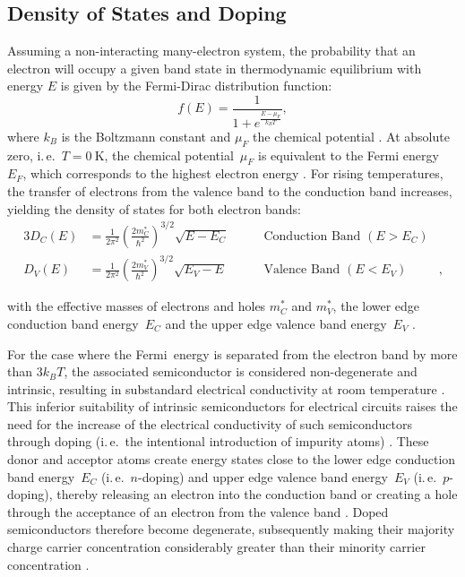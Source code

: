 \subsection{Density of States and Doping} \label{ssec:density-of-states-doping}
Assuming a non-interacting many-electron system, the probability that an electron will occupy a given band state in thermodynamic equilibrium with energy $E$ is given by the Fermi-Dirac distribution function:
\begin{equation}
  f\left(E\right) = \frac{1}{1 + e^{\frac{E-\mu_F}{k_B T}}},
\end{equation}
where $k_B$ is the Boltzmann constant and $\mu_F$ the chemical potential \cite{Piprek2003,Kittel2004,Yu2010}. At absolute zero, i.\,e.\ $T = \SI{0}{\kelvin}$, the chemical potential~$\mu_F$ is equivalent to the Fermi energy~$E_F$, which corresponds to the highest electron energy \cite{Piprek2003,Kittel2004,Yu2010}. For rising temperatures, the transfer of electrons from the valence band to the conduction band increases, yielding the density of states for both electron bands:
\begin{alignat}{3}
  D_C\left(E\right) &= \frac{1}{2\pi^2} \left(\frac{2m_C^\ast}{\hbar^2}\right)^{3/2} \sqrt{E-E_C} &\qquad\text{Conduction Band $\left(E > E_C\right)$}&\\
  D_V\left(E\right) &= \frac{1}{2\pi^2} \left(\frac{2m_V^\ast}{\hbar^2}\right)^{3/2} \sqrt{E_V-E} &\qquad\text{Valence Band $\left(E<E_V\right)$}&,
\end{alignat}

with the effective masses of electrons and holes $m_C^\ast$ and $m_V^\ast$, the lower edge conduction band energy~$E_C$ and the upper edge valence band energy~$E_V$ \cite{Piprek2003,Kittel2004,Yu2010}.

For the case where the Fermi~energy is separated from the electron band by more than $3k_B T$, the associated semiconductor is considered non-degenerate and intrinsic, resulting in substandard electrical conductivity at room temperature \cite{Piprek2003,Kittel2004,Yu2010}. This inferior suitability of intrinsic semiconductors for electrical circuits raises the need for the increase of the electrical conductivity of such semiconductors through doping (i.\,e.\ the intentional introduction of impurity atoms) \cite{Piprek2003,Kittel2004,Yu2010}. These donor and acceptor atoms create energy states close to the lower edge conduction band energy~$E_C$ (i.\,e.\ $n$-doping) and upper edge valence band energy~$E_V$ (i.\,e.\ $p$-doping), thereby releasing an electron into the conduction band or creating a hole through the acceptance of an electron from the valence band \cite{Piprek2003,Kittel2004,Yu2010}. Doped semiconductors therefore become degenerate, subsequently making their majority charge carrier concentration considerably greater than their minority carrier concentration \cite{Piprek2003,Kittel2004,Yu2010}.
